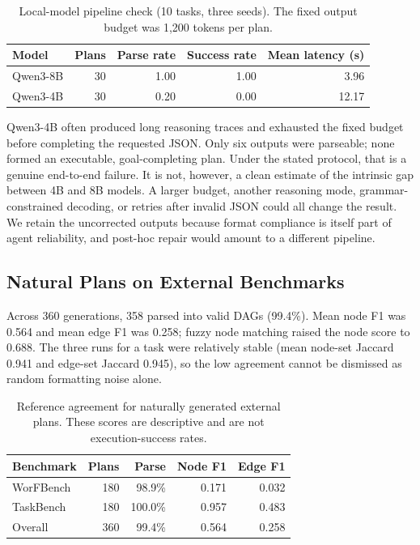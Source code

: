\documentclass[10pt]{article}
\begin{document}
\begin{table}[t]
\centering
\caption{Local-model pipeline check (10 tasks, three seeds). The fixed output
budget was 1,200 tokens per plan.}
\label{tab:models}
\begin{tabular}{lrrrr}
\toprule
Model & Plans & Parse rate & Success rate & Mean latency (s) \\
\midrule
Qwen3-8B & 30 & 1.00 & 1.00 & 3.96 \\
Qwen3-4B & 30 & 0.20 & 0.00 & 12.17 \\
\bottomrule
\end{tabular}
\end{table}

Qwen3-4B often produced long reasoning traces and exhausted the fixed
budget before completing the requested JSON. Only six outputs were parseable;
none formed an executable, goal-completing plan. Under the stated protocol,
that is a genuine end-to-end failure. It is not, however, a clean estimate of
the intrinsic gap between 4B and 8B models. A larger budget, another reasoning
mode, grammar-constrained decoding, or retries after invalid JSON could all
change the result. We retain the uncorrected outputs because format compliance
is itself part of agent reliability, and post-hoc repair would amount to a
different pipeline.

\subsection{Natural Plans on External Benchmarks}
Across 360 generations, 358 parsed into valid DAGs (99.4\%). Mean node F1 was
0.564 and mean edge F1 was 0.258; fuzzy node matching raised the node score to
0.688. The three runs for a task were relatively stable (mean node-set Jaccard
0.941 and edge-set Jaccard 0.945), so the low agreement cannot be dismissed as
random formatting noise alone.

\begin{table}[t]
\centering
\caption{Reference agreement for naturally generated external plans. These
scores are descriptive and are not execution-success rates.}
\label{tab:externalplans}
\begin{tabular}{lrrrr}
\toprule
Benchmark & Plans & Parse & Node F1 & Edge F1 \\
\midrule
WorFBench & 180 & 98.9\% & 0.171 & 0.032 \\
TaskBench & 180 & 100.0\% & 0.957 & 0.483 \\
\midrule
Overall & 360 & 99.4\% & 0.564 & 0.258 \\
\bottomrule
\end{tabular}
\end{table}
\end{document}
